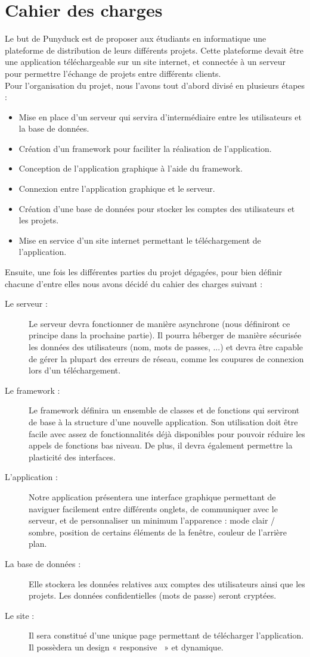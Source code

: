 \documentclass{report}
\begin{document}
\section*{Cahier des charges}
Le but de Punyduck est de proposer aux étudiants en informatique une plateforme de distribution de leurs différents projets. Cette plateforme devait être une application téléchargeable sur un site internet, et connectée à un serveur pour permettre l'échange de projets entre différents clients. \\
Pour l'organisation du projet, nous l'avons tout d'abord divisé en plusieurs étapes : 
\begin{itemize}[label=$-$]
    \item Mise en place d’un serveur qui servira d’intermédiaire entre les utilisateurs et la base de données.
    \item Création d’un framework pour faciliter la réalisation de l’application.
    \item Conception de l’application graphique à l’aide du framework.
    \item Connexion entre l’application graphique et le serveur.
    \item Création d’une base de données pour stocker les comptes des utilisateurs et les
projets.
    \item Mise en service d’un site internet permettant le téléchargement de l’application.
\end{itemize}
\newpage
Ensuite, une fois les différentes parties du projet dégagées, pour bien définir chacune d'entre elles nous avons décidé du cahier des charges suivant :
\begin{description}
    \item[Le serveur :] Le serveur devra fonctionner de manière asynchrone (nous définiront ce principe dans la prochaine partie). Il pourra héberger de manière sécurisée les données des utilisateurs (nom, mots de passes, ...) et devra être capable de gérer la plupart des erreurs de réseau, comme les coupures de connexion lors d'un téléchargement.
    \item[Le framework :] Le framework définira un ensemble de classes et de fonctions qui serviront de base à la structure d'une nouvelle application. Son utilisation doit être facile avec assez de fonctionnalités déjà disponibles pour pouvoir réduire les appels de fonctions bas niveau. De plus, il devra également permettre la plasticité des interfaces.
    \item[L’application :] Notre application présentera une interface graphique permettant de naviguer facilement entre différents onglets, de communiquer avec le serveur, et de personnaliser un minimum l'apparence : mode clair / sombre, position de certains éléments de la fenêtre, couleur de l’arrière plan.
    \item[La base de données :] Elle stockera les données relatives aux comptes des utilisateurs ainsi que les projets. Les données confidentielles (mots de passe) seront cryptées.
    \item[Le site :] Il sera constitué d'une unique page permettant de télécharger l'application. Il possèdera un design « responsive~ » et dynamique.
\end{description}
\end{document}
